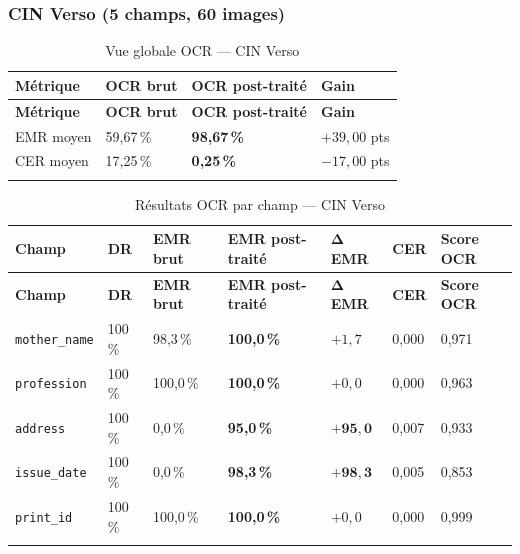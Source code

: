 \subsubsection{CIN Verso (5 champs, 60 images)}

\renewcommand{\arraystretch}{1.35}
\setlength{\LTleft}{0pt plus 1fill}
\setlength{\LTright}{0pt plus 1fill}
\begin{longtable}{|p{3cm}|p{3.5cm}|p{4cm}|p{3.5cm}|}
  \hline
  \rowcolor{bleu_principal!15}
  \textbf{Métrique} & \textbf{OCR brut} & \textbf{OCR post-traité} & \textbf{Gain} \\
  \hline
  \endfirsthead
  \hline
  \rowcolor{bleu_principal!15}
  \textbf{Métrique} & \textbf{OCR brut} & \textbf{OCR post-traité} & \textbf{Gain} \\
  \hline
  \endhead
  EMR moyen & 59,67\,\% & \textbf{98,67\,\%} & $+39{,}00$ pts \\
  \hline
  CER moyen & 17,25\,\% & \textbf{0,25\,\%} & $-17{,}00$ pts \\
  \hline
  \caption{Vue globale OCR --- CIN Verso}
  \label{tab:ocr-global-verso}
\end{longtable}

\renewcommand{\arraystretch}{1.35}
\setlength{\LTleft}{0pt plus 1fill}
\setlength{\LTright}{0pt plus 1fill}
\begin{longtable}{|p{2.8cm}|p{1.3cm}|p{1.8cm}|p{2.5cm}|p{1.8cm}|p{1.3cm}|p{2cm}|}
  \hline
  \rowcolor{bleu_principal!15}
  \textbf{Champ} & \textbf{DR} & \textbf{EMR brut} & \textbf{EMR post-traité} & $\boldsymbol{\Delta}$\textbf{EMR} & \textbf{CER} & \textbf{Score OCR} \\
  \hline
  \endfirsthead
  \hline
  \rowcolor{bleu_principal!15}
  \textbf{Champ} & \textbf{DR} & \textbf{EMR brut} & \textbf{EMR post-traité} & $\boldsymbol{\Delta}$\textbf{EMR} & \textbf{CER} & \textbf{Score OCR} \\
  \hline
  \endhead
  \texttt{mother\_name} & 100\,\% & 98,3\,\%  & \textbf{100,0\,\%} & $+1{,}7$           & 0,000 & 0,971 \\
  \hline
  \texttt{profession}   & 100\,\% & 100,0\,\% & \textbf{100,0\,\%} & $+0{,}0$           & 0,000 & 0,963 \\
  \hline
  \texttt{address}      & 100\,\% & 0,0\,\%   & \textbf{95,0\,\%}  & $\mathbf{+95{,}0}$ & 0,007 & 0,933 \\
  \hline
  \texttt{issue\_date}  & 100\,\% & 0,0\,\%   & \textbf{98,3\,\%}  & $\mathbf{+98{,}3}$ & 0,005 & 0,853 \\
  \hline
  \texttt{print\_id}    & 100\,\% & 100,0\,\% & \textbf{100,0\,\%} & $+0{,}0$           & 0,000 & 0,999 \\
  \hline
  \caption{Résultats OCR par champ --- CIN Verso}
  \label{tab:ocr-champs-verso}
\end{longtable}

